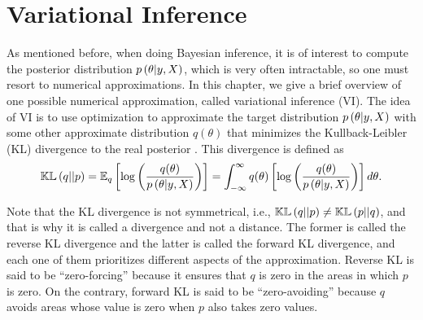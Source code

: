 
\chapter{Variational Inference}
\label{ch:variational_inference}



As mentioned before, when doing Bayesian inference, it is of interest to compute the posterior distribution $p\left( \theta | y, X \right)$, which is very often intractable, so one must resort to numerical approximations. In this chapter, we give a brief overview of one possible numerical approximation, called variational inference (VI). The idea of VI is to use optimization to approximate the target distribution $p\left( \theta | y, X \right)$ with some other approximate distribution $q(\theta)$ that minimizes the Kullback-Leibler (KL) divergence to the real posterior \cite{blei2017variational}. This divergence is defined as
\begin{equation}
  \label{eq:kl_divergence}
  \mathbb{KL}\left( q || p \right) = \mathbb{E}_q \left[ \log \left( \frac{q(\theta)}{p\left( \theta | y, X \right)} \right) \right] = \int_{-\infty}^{\infty} q(\theta) \left[ \log \left( \frac{q(\theta)}{p\left( \theta | y, X \right)} \right) \right] d\theta.
\end{equation}

Note that the KL divergence is not symmetrical, i.e., $\mathbb{KL}\left( q || p \right) \neq \mathbb{KL}\left( p || q \right)$, and that is why it is called a divergence and not a distance. The former is called the reverse KL divergence and the latter is called the forward KL divergence, and each one of them prioritizes different aspects of the approximation. Reverse KL is said to be ``zero-forcing'' because it ensures that $q$ is zero in the areas in which $p$ is zero. On the contrary, forward KL is said to be ``zero-avoiding'' because $q$ avoids areas whose value is zero when $p$ also takes zero values.

